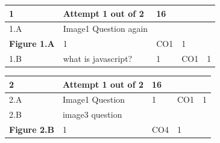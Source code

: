 \documentclass[12pt]{article}
\begin{document}
	\begin{tabular}{|L{1cm}|L{8cm}|C{1cm}|C{1cm}|C{1cm}|}\hline
			\bf1 & \bf{Attempt} \bf1 out of \bf2 & \bf16 & & \\ \hline
				1.A &
	Image1 Question again \newline
		\begin{center}
		\includegraphics[width=4cm,height=3cm]{media/diagrams/image1.png}\\\bf{Figure }\bf1.A	
	\end{center}

	
		 &  1 & CO1 & 1\\ \hline
		1.B &
	what is javascript? \newline
		 &  1 & CO1 & 1\\ \hline
		\end{tabular}

	
	


	
	
		

	
	
	\begin{tabular}{|L{1cm}|L{8cm}|C{1cm}|C{1cm}|C{1cm}|}\hline
			\bf2 & \bf{Attempt} \bf1 out of \bf2 & \bf16 & & \\ \hline
				2.A &
	Image1 Question \newline
		 &  1 & CO1 & 1\\ \hline
		2.B &
	image3 question \newline
		\begin{center}
		\includegraphics[width=4cm,height=3cm]{media/diagrams/image3.png}\\\bf{Figure }\bf2.B	
	\end{center}

	
		 &  1 & CO4 & 1\\ \hline
		\end{tabular}
\end{document}
